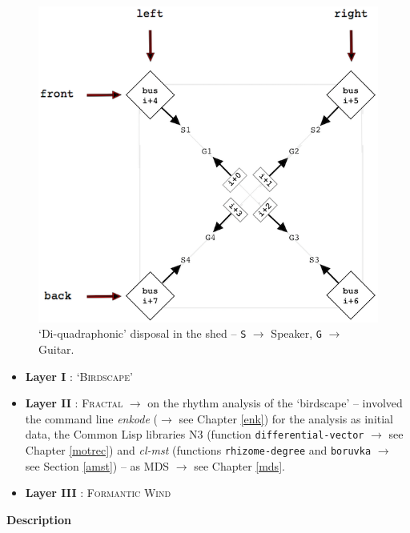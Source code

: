  \begin{figure}[H]
\begin{center}
\includegraphics[scale=3.5]{img/6644}
\caption{`Di-quadraphonic' disposal in the shed -- \texttt{S} $\rightarrow$ Speaker, \texttt{G} $\rightarrow$ Guitar.}
\label{dpan}
\end{center}
\end{figure}

\begin{itemize}[leftmargin=0.4in]
\item \textbf{Layer I} : \textsc{`Birdscape'} 
\item \textbf{Layer II} : \textsc{Fractal} $\rightarrow$ on the rhythm analysis of the `birdscape' -- involved the command line \textsl{enkode} ($\rightarrow$ see Chapter \ref{enk}) for the analysis as initial data, the Common Lisp libraries N3 (function \texttt{differential-vector} $\rightarrow$ see Chapter \ref{motrec}) and \textsl{cl-mst} (functions \texttt{rhizome-degree} and \texttt{boruvka} $\rightarrow$ see Section \ref{amst}) -- as MDS $\rightarrow$ see Chapter \ref{mds}. 
\item \textbf{Layer III} : \textsc{Formantic Wind} 
\end{itemize}

\bigskip

\noindent \textbf{{\large Description}}
\hrulefill

\bigskip

